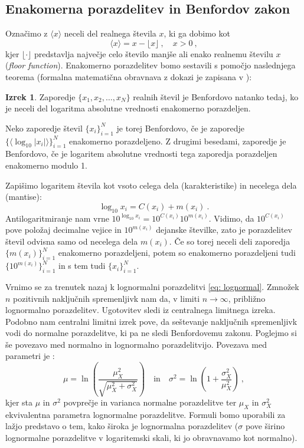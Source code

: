 \documentclass[11pt, oneside]{article}
\theoremstyle{definition}
\newtheorem{theorem}{Izrek}
\begin{document}
\subsection{Enakomerna porazdelitev in Benfordov zakon}
Označimo z $\langle x \rangle$ neceli del realnega števila $x$, ki ga dobimo kot
\begin{equation}
    \langle x \rangle = x - \lfloor x \rfloor \>, \quad x > 0 \>,
\end{equation}
kjer $\lfloor \cdot \rfloor$ predstavlja največje celo število manjše ali enako realnemu številu $x$ (\emph{floor function}).
Enakomerno porazdelitev bomo sestavili s pomočjo naslednjega teorema (formalna matematična obravnava z dokazi je zapisana v \cite{berger2011basic}):
\begin{theorem}
    Zaporedje $\{x_1, x_2, \ldots, x_N \}$ realnih števil je Benfordovo natanko tedaj, ko je neceli del logaritma
    absolutne vrednosti enakomerno porazdeljen.
\end{theorem}
\noindent
Neko zaporedje števil $\{x_i \}_{i=1}^N$ je torej Benfordovo, če je zaporedje
$\{ \langle \log_{10}|x_i| \rangle \}_{i=1}^N$ enakomerno porazdeljeno. Z drugimi besedami, zaporedje je Benfordovo,
če je logaritem absolutne vrednosti tega zaporedja porazdeljen enakomerno modulo 1.

Zapišimo logaritem števila kot vsoto celega dela (karakteristike) in necelega dela (mantise):
\begin{equation}
    \log_{10} x_i = C(x_i) + m(x_i) \>.
\end{equation}
Antilogaritmiranje nam vrne $10^{\log_{10}x_i}=10^{C(x_i)} 10^{m(x_i)}$. Vidimo, da $10^{C(x_i)}$ pove položaj
decimalne vejice in $10^{m(x_i)}$ dejanske številke, zato je porazdelitev števil odvisna samo od necelega
dela $m(x_i)$. Če so torej neceli deli zaporedja $\{ m(x_i) \}_{i=1}^N$ enakomerno porazdeljeni, potem so enakomerno porazdeljeni tudi
$\{ 10^{m(x_i)} \}_{i=1}^N$ in s tem tudi $\{ x_i \}_{i=1}^N$.

Vrnimo se za trenutek nazaj k lognormalni porazdelitvi \ref{eq: lognormal}.
Zmnožek $n$ pozitivnih naključnih spremenljivk nam da, v limiti $n \rightarrow \infty$, približno
lognormalno porazdelitev. Ugotovitev sledi iz centralnega limitnega izreka.
Podobno nam centralni limitni izrek pove, da seštevanje naključnih spremenljivk vodi do normalne
porazdelitve, ki pa ne sledi Benfordovemu zakonu.
Poglejmo si še povezavo med normalno in lognormalno porazdelitvijo.
Povezava med parametri je \cite{enwiki:1034516769}:
\begin{equation}
    \mu = \ln \left ( \frac{\mu_X^2}{\sqrt{\mu_X^2 + \sigma_X^2}} \right ) \quad \text{in} \quad
    \sigma^2 = \ln \left ( 1 + \frac{\sigma_X^2}{\mu_X^2}  \right ) \>,
\end{equation}
kjer sta $\mu$ in $\sigma^2$ povprečje in varianca normalne porazdelitve ter $\mu_X$ in $\sigma^2_X$ ekvivalentna
parametra lognormalne porazdelitve. Formuli bomo uporabili za lažjo predstavo o tem, kako široka je lognormalna
porazdelitev ($\sigma$ pove širino lognormalne porazdelitve v logaritemski skali, ki jo obravnavamo kot normalno).
\end{document}

